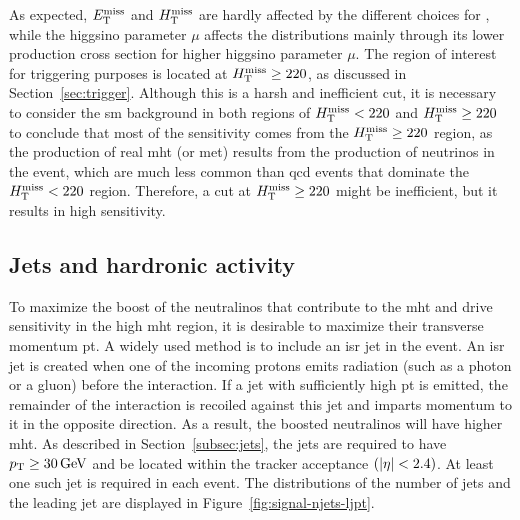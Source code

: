 As expected, $E_{\mathrm{T}}^{\text{miss}}$ and $H_{\mathrm{T}}^{\text{miss}}$ are hardly affected by the different choices for \dm, while the higgsino parameter $\mu$ affects the distributions mainly through its lower production cross section for higher higgsino parameter $\mu$. The region of interest for triggering purposes is located at $H_{\mathrm{T}}^{\text{miss}}\geq 220$, as discussed in Section~\ref{sec:trigger}. Although this is a harsh and inefficient cut, it is necessary to consider the \gls{sm} background in both regions of $H_{\mathrm{T}}^{\text{miss}} < 220$ and $H_{\mathrm{T}}^{\text{miss}}\geq 220$ to conclude that most of the sensitivity comes from the $H_{\mathrm{T}}^{\text{miss}}\geq 220$ region, as the production of real \gls{mht} (or \gls{met}) results from the production of neutrinos in the event, which are much less common than \gls{qcd} events that dominate the $H_{\mathrm{T}}^{\text{miss}} < 220$ region. Therefore, a cut at $H_{\mathrm{T}}^{\text{miss}}\geq 220$ might be inefficient, but it results in high sensitivity.

\subsection{Jets and hardronic activity}

To maximize the boost of the \glspl{neutralino} \neuto that contribute to the \gls{mht} and drive sensitivity in the high \gls{mht} region, it is desirable to maximize their transverse momentum \gls{pt}. A widely used method is to include an \gls{isr} jet in the event. An \gls{isr} jet is created when one of the incoming protons emits radiation (such as a photon or a gluon) before the interaction. If a jet with sufficiently high \gls{pt} is emitted, the remainder of the interaction is recoiled against this jet and imparts momentum to it in the opposite direction. As a result, the boosted \glspl{neutralino} \neuto will have higher \gls{mht}. As described in Section~\ref{subsec:jets}, the jets are required to have $p_{\mathrm{T}} \geq 30\,\text{Ge\hspace{-.08em}V}$ and be located within the tracker acceptance $\left(\lvert \eta \rvert<2.4\right)$. At least one such jet is required in each event. The distributions of the number of jets and the leading jet \pt are displayed in Figure~\ref{fig:signal-njets-ljpt}.


